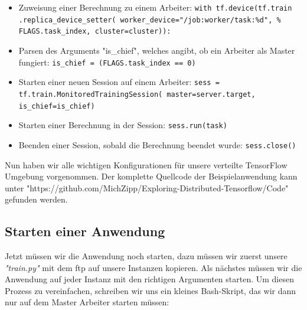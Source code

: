 \begin{itemize}
	\item Zuweisung einer Berechnung zu einem Arbeiter: \newline
		\texttt{with tf.device(tf.train \newline
			\hspace*{5mm} .replica\_device\_setter(
			\hspace*{5mm} worker\_device="/job:worker/task:\%d",\newline
			\hspace*{5mm} \% FLAGS.task\_index, cluster=cluster)):}
	\item Parsen des Arguments "is\_chief", welches angibt, ob ein Arbeiter als Master fungiert: \newline
		\texttt{is\_chief = (FLAGS.task\_index == 0)}
	\item Starten einer neuen Session auf einem Arbeiter: \newline
		\texttt{sess = tf.train.MonitoredTrainingSession(
			master=server.target,
			is\_chief=is\_chief)}
	\item Starten einer Berechnung in der Session: \newline
		\texttt{sess.run(task)}
	\item Beenden einer Session, sobald die Berechnung beendet wurde: \newline
		\texttt{sess.close()}
\end{itemize}

Nun haben wir alle wichtigen Konfigurationen für unsere verteilte TensorFlow Umgebung vorgenommen. Der komplette Quellcode der Beispielanwendung kann unter "https://github.com/MichZipp/Exploring-Distributed-Tensorflow/Code" gefunden werden. 

\subsection{Starten einer Anwendung}
Jetzt müssen wir die Anwendung noch starten, dazu müssen wir zuerst unsere \textit{"train.py"} mit dem \ac{ftp} auf unsere Instanzen kopieren. Als nächstes müssen wir die Anwendung auf jeder Instanz mit den richtigen Argumenten starten. Um diesen Prozess zu vereinfachen, schreiben wir uns ein kleines Bash-Skript, das wir dann nur auf dem Master Arbeiter starten müssen:


